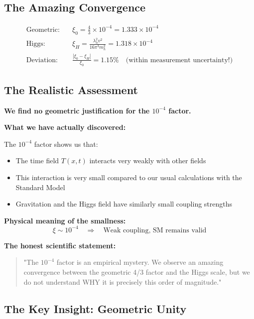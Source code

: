 \documentclass[12pt,a4paper]{article}
\begin{document}
\subsection{The Amazing Convergence}
\label{subsec:amazing_convergence}
\begin{align}
	\text{Geometric:} \quad &\xi_0 = \frac{4}{3} \times 10^{-4} = 1.333 \times 10^{-4} \\
	\text{Higgs:} \quad &\xi_H = \frac{\lambda_h^2 v^2}{16\pi^3 m_h^2} = 1.318 \times 10^{-4} \\
	\text{Deviation:} \quad &\frac{|\xi_0 - \xi_H|}{\xi_0} = 1.15\% \quad \text{(within measurement uncertainty!)}
\end{align}

\subsection{The Realistic Assessment}
\label{subsec:realistic_assessment}

\textbf{We find no geometric justification for the $10^{-4}$ factor.}

\textbf{What we have actually discovered:}

The $10^{-4}$ factor shows us that:
\begin{itemize}
	\item The time field $T(x,t)$ interacts very weakly with other fields
	\item This interaction is very small compared to our usual calculations with the Standard Model
	\item Gravitation and the Higgs field have similarly small coupling strengths
\end{itemize}

\textbf{Physical meaning of the smallness:}
\begin{equation}
	\xi \sim 10^{-4} \quad \Rightarrow \quad \text{Weak coupling, SM remains valid}
\end{equation}

\textbf{The honest scientific statement:}
\begin{quote}
	"The $10^{-4}$ factor is an empirical mystery. We observe an amazing convergence between the geometric 4/3 factor and the Higgs scale, but we do not understand WHY it is precisely this order of magnitude."
\end{quote}

\subsection{The Key Insight: Geometric Unity}
\label{subsec:key_insight}
\end{document}
